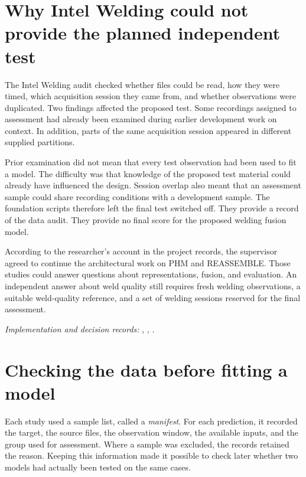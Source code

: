 \section{Why Intel Welding could not provide the planned independent test}
\label{sec:ch4-welding}

The Intel Welding audit checked whether files could be read, how they were timed, which
acquisition session they came from, and whether observations were duplicated. Two
findings affected the proposed test. Some recordings assigned to assessment had already
been examined during earlier development work on context. In addition, parts of the same
acquisition session appeared in different supplied partitions.

Prior examination did not mean that every test observation had been used to fit a model.
The difficulty was that knowledge of the proposed test material could already have
influenced the design. Session overlap also meant that an assessment sample could share
recording conditions with a development sample. The foundation scripts therefore left
the final test switched off. They provide a record of the data audit. They provide no
final score for the proposed welding fusion model.

According to the researcher’s account in the project records, the supervisor agreed to
continue the architectural work on PHM and REASSEMBLE. Those studies could answer
questions about representations, fusion, and evaluation. An independent answer about
weld quality still requires fresh welding observations, a suitable weld-quality
reference, and a set of welding sessions reserved for the final assessment.

\noindent\textit{Implementation and decision records:}
, ,
.

\section{Checking the data before fitting a model}
\label{sec:ch4-admission}

Each study used a sample list, called a \emph{manifest}. For each prediction, it
recorded the target, the source files, the observation window, the available inputs, and
the group used for assessment. Where a sample was excluded, the records retained the
reason. Keeping this information made it possible to check later whether two models had
actually been tested on the same cases.

